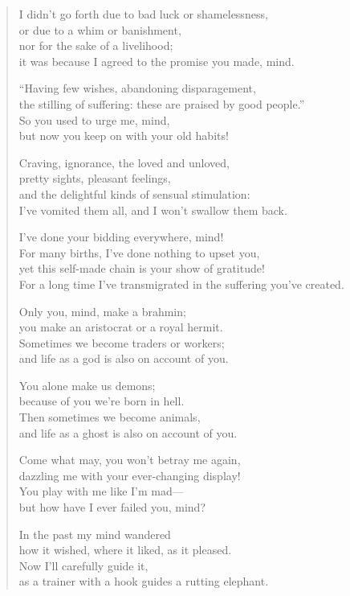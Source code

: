 \documentclass[12pt,openany]{book}%
\begin{document}
\begin{verse}
I didn’t go forth due to bad luck or shamelessness, \\
or due to a whim or banishment, \\
nor for the sake of a livelihood; \\
it was because I agreed to the promise you made, mind. 

“Having few wishes, abandoning disparagement, \\
the stilling of suffering: these are praised by good people.” \\
So you used to urge me, mind, \\
but now you keep on with your old habits! 

Craving, ignorance, the loved and unloved, \\
pretty sights, pleasant feelings, \\
and the delightful kinds of sensual stimulation: \\
I’ve vomited them all, and I won’t swallow them back. 

I’ve done your bidding everywhere, mind! \\
For many births, I’ve done nothing to upset you, \\
yet this self-made chain is your show of gratitude! \\
For a long time I’ve transmigrated in the suffering you’ve created. 

Only you, mind, make a brahmin; \\
you make an aristocrat or a royal hermit. \\
Sometimes we become traders or workers; \\
and life as a god is also on account of you. 

You alone make us demons; \\
because of you we’re born in hell. \\
Then sometimes we become animals, \\
and life as a ghost is also on account of you. 

Come what may, you won’t betray me again, \\
dazzling me with your ever-changing display! \\
You play with me like I’m mad—\\
but how have I ever failed you, mind? 

In the past my mind wandered \\
how it wished, where it liked, as it pleased. \\
Now I’ll carefully guide it, \\
as a trainer with a hook guides a rutting elephant. 


\end{verse}
\end{document}
